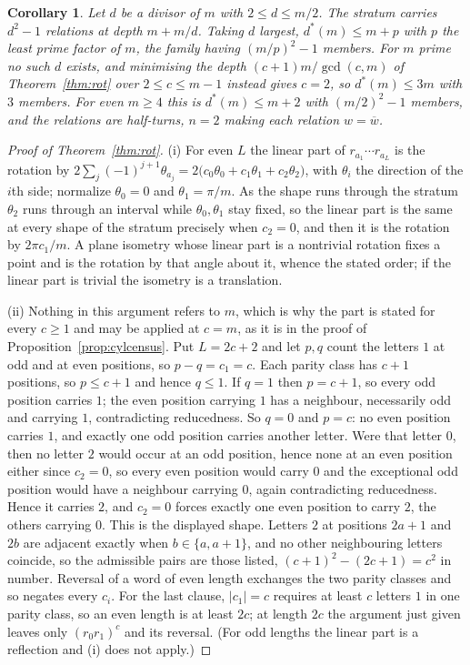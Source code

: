 \documentclass[11pt]{article}
\newtheorem{corollary}[theorem]{Corollary}
\theoremstyle{definition}
\theoremstyle{remark}
\begin{document}
\begin{corollary}\label{cor:onset}
Let $d$ be a divisor of $m$ with $2\le d\le m/2$. The stratum carries $d^2-1$
relations at depth $m+m/d$. Taking $d$ largest, $d^{*}(m)\le m+p$ with $p$ the
least prime factor of $m$, the family having $(m/p)^2-1$ members. For $m$
prime no such $d$ exists, and minimising the depth $(c+1)m/\gcd(c,m)$ of
Theorem~\ref{thm:rot} over $2\le c\le m-1$ instead gives $c=2$, so
$d^{*}(m)\le3m$ with $3$ members. For even $m\ge4$ this is
$d^{*}(m)\le m+2$ with $(m/2)^2-1$ members, and the relations are half-turns,
$n=2$ making each relation $w=\overline{w}$.
\end{corollary}

\begin{proof}[Proof of Theorem~\ref{thm:rot}]
(i) For even $L$ the linear part of $r_{a_1}\cdots r_{a_L}$ is the rotation by
$2\sum_j(-1)^{j+1}\theta_{a_j}=2\bigl(c_0\theta_0+c_1\theta_1+c_2\theta_2\bigr)$,
with $\theta_i$ the direction of the $i$th side; normalize $\theta_0=0$ and
$\theta_1=\pi/m$. As the shape runs through the stratum $\theta_2$ runs through
an interval while $\theta_0,\theta_1$ stay fixed, so the linear part is the
same at every shape of the stratum precisely when $c_2=0$, and then it is the
rotation by $2\pi c_1/m$. A plane isometry whose linear part is a nontrivial
rotation fixes a point and is the rotation by that angle about it, whence the
stated order; if the linear part is trivial the isometry is a translation.

(ii) Nothing in this argument refers to $m$, which is why the part is stated
for every $c\ge1$ and may be applied at $c=m$, as it is in the proof of
Proposition~\ref{prop:cylcensus}. Put $L=2c+2$ and let $p,q$ count the letters $1$ at odd and at even
positions, so $p-q=c_1=c$. Each parity class has $c+1$ positions, so $p\le c+1$
and hence $q\le1$. If $q=1$ then $p=c+1$, so every odd position carries $1$;
the even position carrying $1$ has a neighbour, necessarily odd and carrying
$1$, contradicting reducedness. So $q=0$ and $p=c$: no even position carries
$1$, and exactly one odd position carries another letter. Were that letter $0$,
then no letter $2$ would occur at an odd position, hence none at an even
position either since $c_2=0$, so every even position would carry $0$ and the
exceptional odd position would have a neighbour carrying $0$, again
contradicting reducedness. Hence it carries $2$, and $c_2=0$ forces exactly one
even position to carry $2$, the others carrying $0$. This is the displayed
shape. Letters $2$ at positions $2a+1$ and $2b$ are adjacent exactly when
$b\in\{a,a+1\}$, and no other neighbouring letters coincide, so the admissible
pairs are those listed, $(c+1)^2-(2c+1)=c^2$ in number. Reversal of a word of
even length exchanges the two parity classes and so negates every $c_i$. For
the last clause, $|c_1|=c$ requires at least $c$ letters $1$ in one parity
class, so an even length is at least $2c$; at length $2c$ the argument just
given leaves only $(r_0r_1)^c$ and its reversal. (For odd lengths the linear
part is a reflection and (i) does not apply.)


\end{proof}
\end{document}
